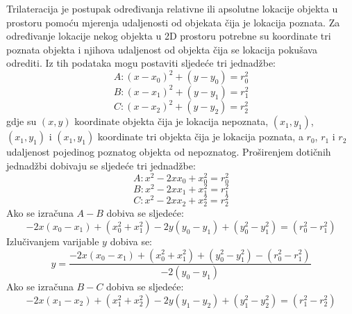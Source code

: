 Trilateracija je postupak određivanja relativne ili apsolutne lokacije objekta u prostoru pomoću mjerenja udaljenosti od objekata čija je lokacija poznata. 
Za određivanje lokacije nekog objekta u 2D prostoru potrebne su koordinate tri poznata objekta i njihova udaljenost od objekta čija se lokacija pokušava odrediti. 
Iz tih podataka mogu postaviti sljedeće tri jednadžbe:
\begin{equation}
    A: (x-x_0)^2 + (y-y_0)=r_0^2
\end{equation}
\begin{equation}
    B: (x-x_1)^2 + (y-y_1)=r_1^2
\end{equation}
\begin{equation}
    C: (x-x_2)^2 + (y-y_2)=r_2^2
\end{equation}
gdje su $(x,y)$ koordinate objekta čija je lokacija nepoznata, $(x_1,y_1)$, $(x_1,y_1)$ i $(x_1,y_1)$ koordinate tri objekta čija je lokacija poznata, a $r_0$, $r_1$ i $r_2$ udaljenost pojedinog poznatog objekta od nepoznatog. 
Proširenjem dotičnih jednadžbi dobivaju se sljedeće tri jednadžbe:
\begin{equation}
    A: x^2 - 2xx_0 + x_0^2=r_0^2
\end{equation}
\begin{equation}
    B: x^2 - 2xx_1 + x_1^2=r_1^2
\end{equation}
\begin{equation}
    C: x^2 - 2xx_2 + x_2^2=r_2^2
\end{equation}
Ako se izračuna $A-B$ dobiva se sljedeće:
\begin{equation}
    -2x(x_0 - x_1) + (x_0^2 + x_1^2) - 2y(y_0 - y_1) + (y_0^2 - y_1^2) = (r_0^2 - r_1^2)
\end{equation}
Izlučivanjem varijable $y$ dobiva se:
\begin{equation}
\label{eq:aby}
    y = \frac{-2x(x_0 - x_1) + (x_0^2+x_1^2) + (y_0^2 - y_1^2) - (r_0^2 - r_1^2)}{-2(y_0 - y_1)}
\end{equation}
Ako se izračuna $B-C$ dobiva se sljedeće:
\begin{equation}
    -2x(x_1 - x_2) + (x_1^2+x_2^2) - 2y(y_1 - y_2) + (y_1^2 - y_2^2) = (r_1^2 - r_2^2)
\end{equation}
